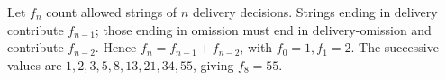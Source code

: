 Let $f_n$ count allowed strings of $n$ delivery decisions. Strings ending in delivery contribute $f_{n-1}$; those ending in omission must end in delivery-omission and contribute $f_{n-2}$. Hence $f_n=f_{n-1}+f_{n-2}$, with $f_0=1,f_1=2$. The successive values are $1,2,3,5,8,13,21,34,55$, giving $\boxed{f_8=55}$.
